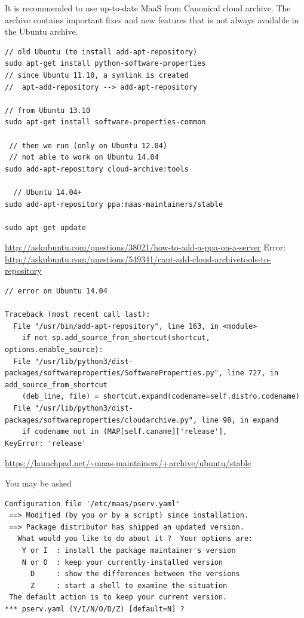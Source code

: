 It is recommended to use up-to-date MaaS from Canonical cloud archive.
The archive contains important fixes and new features that is not always
available in the Ubuntu archive.
\begin{verbatim}
// old Ubuntu (to install add-apt-repository)
sudo apt-get install python-software-properties
// since Ubuntu 11.10, a symlink is created
//  apt-add-repository --> add-apt-repository

// from Ubuntu 13.10
sudo apt-get install software-properties-common
 
 // then we run (only on Ubuntu 12.04)
 // not able to work on Ubuntu 14.04 
sudo add-apt-repository cloud-archive:tools

  // Ubuntu 14.04+
sudo add-apt-repository ppa:maas-maintainers/stable

sudo apt-get update  
\end{verbatim}
\url{http://askubuntu.com/questions/38021/how-to-add-a-ppa-on-a-server}
Error:
\url{http://askubuntu.com/questions/549341/cant-add-cloud-archivetools-to-repository} 
{\tiny
\begin{verbatim}
// error on Ubuntu 14.04

Traceback (most recent call last):
  File "/usr/bin/add-apt-repository", line 163, in <module>
    if not sp.add_source_from_shortcut(shortcut, options.enable_source):
  File "/usr/lib/python3/dist-packages/softwareproperties/SoftwareProperties.py", line 727, in add_source_from_shortcut
    (deb_line, file) = shortcut.expand(codename=self.distro.codename)
  File "/usr/lib/python3/dist-packages/softwareproperties/cloudarchive.py", line 98, in expand
    if codename not in (MAP[self.caname]['release'],
KeyError: 'release'
\end{verbatim}
}
\url{https://launchpad.net/~maas-maintainers/+archive/ubuntu/stable}

You may be asked
\begin{verbatim}
Configuration file '/etc/maas/pserv.yaml'
 ==> Modified (by you or by a script) since installation.
 ==> Package distributor has shipped an updated version.
   What would you like to do about it ?  Your options are:
    Y or I  : install the package maintainer's version
    N or O  : keep your currently-installed version
      D     : show the differences between the versions
      Z     : start a shell to examine the situation
 The default action is to keep your current version.
*** pserv.yaml (Y/I/N/O/D/Z) [default=N] ?

\end{verbatim}

